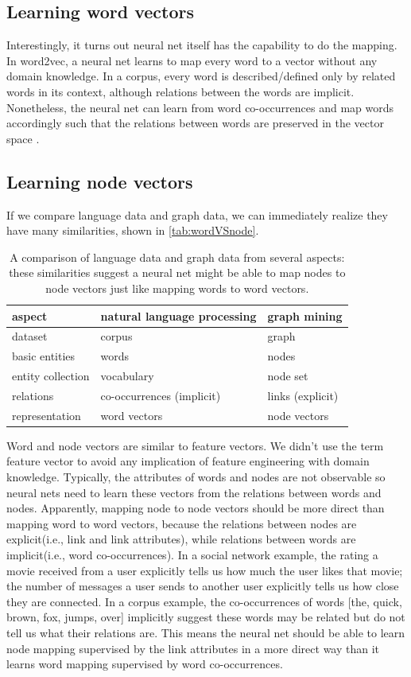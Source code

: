 \documentclass{article}
\begin{document}
\subsection{Learning word vectors}
Interestingly, it turns out neural net itself has the capability to do the 
mapping.
In word2vec, a neural net learns to map every word to a vector without any 
domain knowledge. In a corpus, every word is described/defined only by related 
words in its context, although relations between the words are implicit. 
Nonetheless, the neural net can learn from word co-occurrences and map words 
accordingly such that the relations between words are preserved in the vector 
space \cite{mikolov2013distributed}.

\subsection{Learning node vectors}

If we compare language data and graph data, we can immediately realize they 
have many similarities, shown in \autoref{tab:wordVSnode}.
\begin{table}[h]
	\centering
	\begin{tabularx}{\textwidth}{ |X|X|X| } \hline
		aspect  & natural language processing & graph mining \\ \hline
		dataset & corpus & graph \\ \hline
		basic entities & words & nodes \\ \hline
		entity collection & vocabulary & node set \\ \hline
		relations & co-occurrences (implicit) & links (explicit) \\ \hline
		representation & word vectors & node vectors \\ \hline
	\end{tabularx}
	\caption{A comparison of language data and graph data from 
		several aspects: these similarities suggest a neural net might be able 
		to map nodes to node vectors just like mapping words to word vectors.}
	\label{tab:wordVSnode}
\end{table}
Word and node vectors are similar to feature vectors. We didn't use the term 
feature vector to avoid any implication of feature engineering with domain 
knowledge. Typically, the attributes of words and nodes are not observable so 
neural nets need to learn these vectors from the relations between words and 
nodes.
Apparently, mapping node to node vectors should be more direct than mapping 
word to word vectors, because the relations between nodes are explicit(i.e., 
link and link attributes), while relations between words are implicit(i.e., 
word co-occurrences). In a social network example, the rating a movie received 
from a user explicitly tells us how much the user likes that movie; the number 
of messages a user sends to another user explicitly tells us how close they are 
connected. In a corpus example, the co-occurrences of words [the, quick, brown, 
fox, jumps, over] implicitly suggest these words may be related but do not tell 
us what their relations are. This means the neural net should be able to learn 
node mapping supervised by the link attributes in a more direct way than it 
learns word mapping supervised by word co-occurrences.
\end{document}
